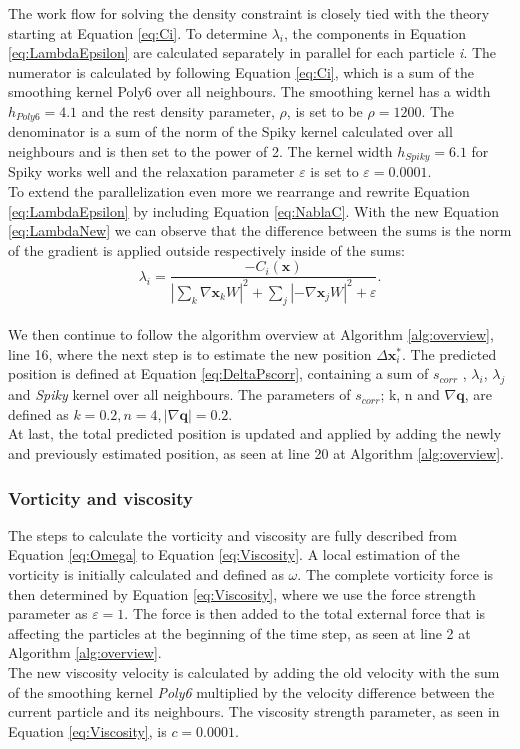 The work flow for solving the density constraint is closely tied with the theory starting at Equation \ref{eq:Ci}.
To determine $\lambda_{i}$, the components in Equation \ref{eq:LambdaEpsilon} are calculated separately in parallel
for each particle \textit{i}.
The numerator is calculated by following Equation \ref{eq:Ci}, which is a sum of the smoothing kernel Poly6 over
all neighbours. The smoothing kernel has a width $h_{Poly6} = 4.1$ and the rest density parameter, $\rho$, is set to be $\rho = 1200$.
The denominator is a sum of the norm of the Spiky kernel calculated over all neighbours
and is then set to the power of 2. The kernel width $h_{Spiky} = 6.1$ for Spiky works well and the
relaxation parameter $\varepsilon$ is set to $\varepsilon = 0.0001$.
\\
\newline
To extend the parallelization even more we rearrange and rewrite Equation \ref{eq:LambdaEpsilon} by including Equation \ref{eq:NablaC}. With the
new Equation \ref{eq:LambdaNew} we can observe that the difference between the sums is the norm of the gradient is applied
outside respectively inside of the sums:
\\
\begin{equation}
\label{eq:LambdaNew}
\lambda_i = \frac{- C_i(\mathbf{x}) }{ |\sum\limits_{k} \nabla \mathbf{x}_k W|^{2} + \sum\limits_{j} |-\nabla \mathbf{x}_j W|^2  + \varepsilon}.
\end{equation}
\\
\newline
We then continue to follow the algorithm overview at Algorithm \ref{alg:overview}, line 16, where the next step is to estimate the new position $\Delta \mathbf{x}^{*}_{i}$.
The predicted position is defined at Equation \ref{eq:DeltaPscorr}, containing a sum of $s_{corr}$ , $\lambda_{i}$, $\lambda_{j}$
and \textit{Spiky} kernel over all neighbours.
The parameters of $s_{corr}$; k, n and $ \nabla \mathbf{q}$, are defined as $k = 0.2, n = 4, |\nabla \mathbf{q}| = 0.2$.
\\
At last, the total predicted position is updated and applied by adding the newly and previously estimated position,
as seen at line 20 at Algorithm \ref{alg:overview}.

\subsubsection{Vorticity and viscosity}
The steps to calculate the vorticity and viscosity are fully described from Equation \ref{eq:Omega} to Equation \ref{eq:Viscosity}.
A local estimation of the vorticity is initially calculated and defined as $\omega$. The complete vorticity force is then determined
by Equation \ref{eq:Viscosity}, where we use the force strength parameter as $\varepsilon = 1$. The force is then added to the total
external force that is affecting the particles at the beginning of the time step, as seen at line 2 at Algorithm \ref{alg:overview}.
\\
The new viscosity velocity is calculated by adding the old velocity with the sum of the smoothing kernel \textit{Poly6} multiplied by the velocity difference between
the current particle and its neighbours. The viscosity strength parameter, as seen in Equation \ref{eq:Viscosity}, is $c = 0.0001$.
